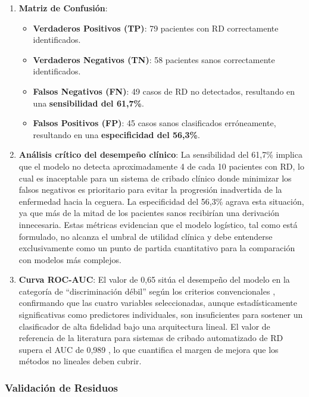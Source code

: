 \begin{enumerate}
    \item \textbf{Matriz de Confusión}:
    \begin{itemize}
        \item \textbf{Verdaderos Positivos (TP)}: 79 pacientes con RD correctamente
        identificados.
        \item \textbf{Verdaderos Negativos (TN)}: 58 pacientes sanos correctamente
        identificados.
        \item \textbf{Falsos Negativos (FN)}: 49 casos de RD no detectados, resultando
        en una \textbf{sensibilidad del 61,7\%}.
        \item \textbf{Falsos Positivos (FP)}: 45 casos sanos clasificados erróneamente,
        resultando en una \textbf{especificidad del 56,3\%}.
    \end{itemize}

    \item \textbf{Análisis crítico del desempeño clínico}: La sensibilidad del 61,7\%
    implica que el modelo no detecta aproximadamente 4 de cada 10 pacientes con RD,
    lo cual es inaceptable para un sistema de cribado clínico donde minimizar los
    falsos negativos es prioritario para evitar la progresión inadvertida de la
    enfermedad hacia la ceguera. La especificidad del 56,3\% agrava esta situación,
    ya que más de la mitad de los pacientes sanos recibirían una derivación innecesaria.
    Estas métricas evidencian que el modelo logístico, tal como está formulado, no
    alcanza el umbral de utilidad clínica y debe entenderse exclusivamente como un
    punto de partida cuantitativo para la comparación con modelos más complejos.

    \item \textbf{Curva ROC-AUC}: El valor de 0,65 sitúa el desempeño del modelo en
    la categoría de ``discriminación débil'' según los criterios convencionales
    \parencite{hosmer2013applied}, confirmando que las cuatro variables seleccionadas,
    aunque estadísticamente significativas como predictores individuales, son
    insuficientes para sostener un clasificador de alta fidelidad bajo una arquitectura
    lineal. El valor de referencia de la literatura para sistemas de cribado automatizado
    de RD supera el AUC de 0,989 \parencite{casanova2014application}, lo que cuantifica
    el margen de mejora que los métodos no lineales deben cubrir.
\end{enumerate}

\subsubsection{Validación de Residuos}

